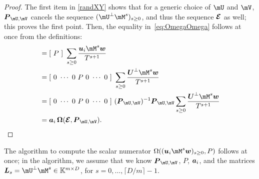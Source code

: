 \documentclass[12pt]{article}
\newcommand{\mat}[1]{\bm{\MakeUppercase{#1}}} %
\newcommand{\row}[1]{\bm{\MakeLowercase{#1}}} %
\newcommand{\col}[1]{\bm{\MakeLowercase{#1}}} %
\newcommand{\seq}{\mat{\mathcal{F}}} %
\newcommand{\minpoly}{P}
\def\K{\mathbb{K}}
\def\K {\ensuremath{\mathbb{K}}}
\begin{document}
\begin{proof}
The first item in \cref{randXY} shows that for a generic choice of
$\mU$ and $\mV$, $\mat{P}_{\mU,\mV}$ cancels the sequence $(\mU^\perp
\mM^s)_{s \ge 0}$, and thus the sequence $\mat{\mathcal{E}}$ as well;
this proves the first point. Then, the equality
in~\eqref{eq:OmegaOmega} follows at once from the definitions:
\begin{align*}
[~ \Omega((\row{u}_i \mM^s \col{w})_{s \ge 0}, \minpoly)~]  &= [~\minpoly~]\ \sum_{s \ge 0} \frac{\row{u}_i \mM^s \col{w}}{T^{s+1}}\\
&=  [~0~\cdots~0~\minpoly~0~\cdots~0~]\  \sum_{s \ge 0} \frac{\mat{U}^\perp \mM^s \col{w}}{T^{s+1}}\\
&=  [~0~\cdots~0~\minpoly~0~\cdots~0~]\ (\mat{P}_{\mU,\mV})^{-1} \mat{P}_{\mU,\mV} \sum_{s \ge 0} \frac{\mat{U}^\perp \mM^s \col{w}}{T^{s+1}}\\
&=  \row{a}_i\, \mat{\Omega}(\mat{\mathcal{E}}, \mat{P}_{\mU,\mV}).
\end{align*}

\end{proof}

The algorithm to compute the scalar numerator $\Omega((\row{u}_i \mM^s
\col{w})_{s \ge 0}, \minpoly)$ follows at once; in the algorithm, we
assume that we know $\mat{P}_{\mU,\mV}$, $P$, $\row{a}_i$, and the
matrices $\mat{L}_s=\mU^\perp \mM^s \in \K^{m \times D}$, for
$s=0,\dots,\lceil D/m \rceil-1$.
\end{document}
